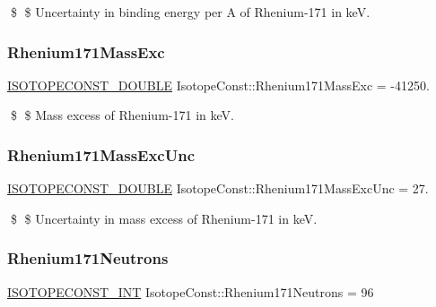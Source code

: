 \$ \$ Uncertainty in binding energy per A of Rhenium-\/171 in keV. \mbox{\label{group___isotope_const-_rhenium-_re171_ga0ebf11e346b5e92bfb6cd46565086060}} 
\subsubsection{\texorpdfstring{Rhenium171\+Mass\+Exc}{Rhenium171MassExc}}
{\footnotesize\ttfamily \mbox{\hyperlink{group___isotope_const-_macros_ga8f45a7272ce02c0b4c65c44636ed719a}{I\+S\+O\+T\+O\+P\+E\+C\+O\+N\+S\+T\+\_\+\+D\+O\+U\+B\+LE}} Isotope\+Const\+::\+Rhenium171\+Mass\+Exc = -\/41250.}

\$ \$ Mass excess of Rhenium-\/171 in keV. \mbox{\label{group___isotope_const-_rhenium-_re171_ga4ed8bc2fb0dabc0256b2d1651c34e4cd}} 
\subsubsection{\texorpdfstring{Rhenium171\+Mass\+Exc\+Unc}{Rhenium171MassExcUnc}}
{\footnotesize\ttfamily \mbox{\hyperlink{group___isotope_const-_macros_ga8f45a7272ce02c0b4c65c44636ed719a}{I\+S\+O\+T\+O\+P\+E\+C\+O\+N\+S\+T\+\_\+\+D\+O\+U\+B\+LE}} Isotope\+Const\+::\+Rhenium171\+Mass\+Exc\+Unc = 27.}

\$ \$ Uncertainty in mass excess of Rhenium-\/171 in keV. \mbox{\label{group___isotope_const-_rhenium-_re171_ga61a49af07a1fb7cead643c667978c76d}} 
\subsubsection{\texorpdfstring{Rhenium171\+Neutrons}{Rhenium171Neutrons}}
{\footnotesize\ttfamily \mbox{\hyperlink{group___isotope_const-_macros_ga5f18360b3e99483a35c32d789e62621c}{I\+S\+O\+T\+O\+P\+E\+C\+O\+N\+S\+T\+\_\+\+I\+NT}} Isotope\+Const\+::\+Rhenium171\+Neutrons = 96}

